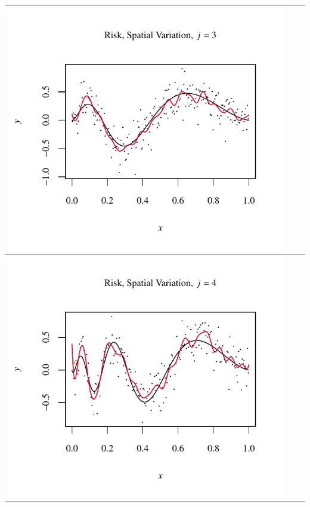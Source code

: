 \documentclass[11pt]{article}
\begin{document}
\begin{table}[h!]
\begin{center}
\begin{tabular}{| >{\centering\arraybackslash}m{2.1in} |  >{\centering\arraybackslash}m{2.1in} |  >{\centering\arraybackslash}m{2.1in}|}
      \includegraphics[width=1\linewidth,height=0.18\textheight]{Graphs/4/3/assignment5_a_4_3_3}\\\hline
      \includegraphics[width=1\linewidth,height=0.18\textheight]{Graphs/4/3/assignment5_a_4_3_4}&

\end{tabular}
\end{center}
\end{table}
\end{document}
